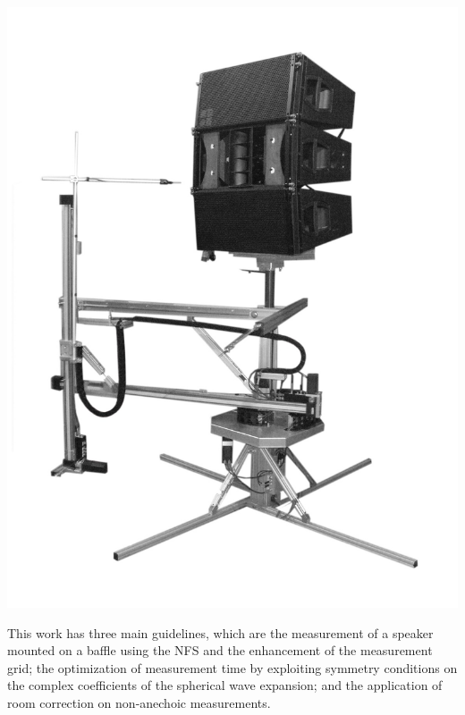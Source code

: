 \documentclass{report}
\begin{document}
\begin{minipage}{0.4\textwidth}
\begin{center}
	\includegraphics[scale=0.13]{Preface/NFS2} 
    \captionsetup{hypcap=false} 
	\label{fig:nfs}
\end{center}
\end{minipage}\newline

This work has three main guidelines, which are the measurement of a speaker mounted on a baffle using the NFS and the enhancement of the measurement grid; the optimization of measurement time by exploiting symmetry conditions on the complex coefficients of the spherical wave expansion; and the application of room correction on non-anechoic measurements.\\
\end{document}
